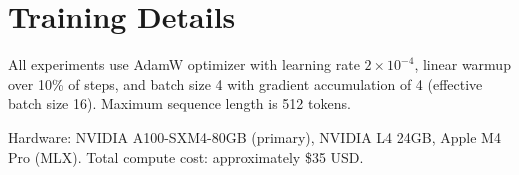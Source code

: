 \documentclass{article}
\begin{document}
\section{Training Details}

All experiments use AdamW optimizer with learning rate $2 \times 10^{-4}$, linear warmup over 10\% of steps, and batch size 4 with gradient accumulation of 4 (effective batch size 16). Maximum sequence length is 512 tokens.

Hardware: NVIDIA A100-SXM4-80GB (primary), NVIDIA L4 24GB, Apple M4 Pro (MLX). Total compute cost: approximately \$35 USD.
\end{document}
